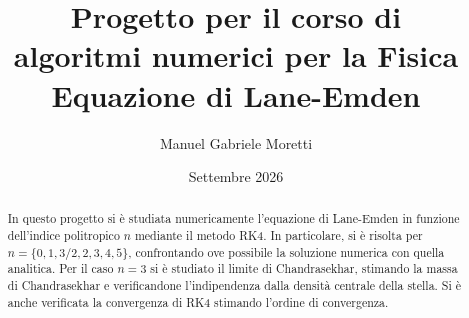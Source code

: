 \documentclass{article}
\title{Progetto per il corso di \\ algoritmi numerici per la Fisica \\ \textbf{Equazione di Lane-Emden}}
\author{Manuel Gabriele Moretti}
\date{Settembre 2026}
\numberwithin{equation}{section}
\begin{document}
\maketitle

\begin{abstract}
    In questo progetto si è studiata numericamente l'equazione di Lane-Emden in funzione dell'indice politropico $n$ mediante il metodo RK4. In particolare, si è risolta per $n = \{0,1,3/2,2,3,4,5\}$, confrontando ove possibile la soluzione numerica con quella analitica. Per il caso $n = 3$ si è studiato il limite di Chandrasekhar, stimando la massa di Chandrasekhar e verificandone l'indipendenza dalla densità centrale della stella. Si è anche verificata la convergenza di RK4 stimando l'ordine di convergenza.
\end{abstract}
\end{document}
